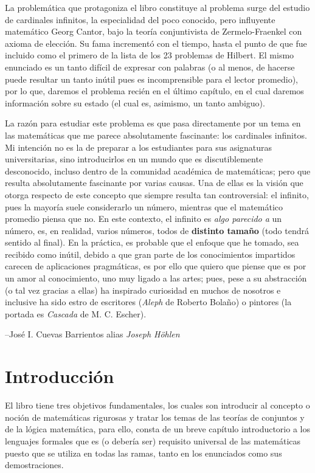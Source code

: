 \documentclass[11pt,a4paper]{book}
\begin{document}
La problemática que protagoniza el libro constituye al problema surge del estudio de cardinales infinitos, la especialidad del poco conocido, pero influyente matemático Georg Cantor, bajo la teoría conjuntivista de Zermelo-Fraenkel con axioma de elección. Su fama incrementó con el tiempo, hasta el punto de que fue incluido como el primero de la lista de los 23 problemas de Hilbert. El mismo enunciado es un tanto difícil de expresar con palabras (o al menos, de hacerse puede resultar un tanto inútil pues es incomprensible para el lector promedio), por lo que, daremos el problema recién en el último capítulo, en el cual daremos información sobre su estado (el cual es, asimismo, un tanto ambiguo).

La razón para estudiar este problema es que pasa directamente por un tema en las matemáticas que me parece absolutamente fascinante: los cardinales infinitos. Mi intención no es la de preparar a los estudiantes para sus asignaturas universitarias, sino introducirlos en un mundo que es discutiblemente desconocido, incluso dentro de la comunidad académica de matemáticas; pero que resulta absolutamente fascinante por varias causas. Una de ellas es la visión que otorga respecto de este concepto que siempre resulta tan controversial: el infinito, pues la mayoría suele considerarlo un número, mientras que el matemático promedio piensa que no. En este contexto, el infinito es \textit{algo parecido a} un número, es, en realidad, varios números, todos de \textbf{distinto tamaño} (todo tendrá sentido al final). En la práctica, es probable que el enfoque que he tomado, sea recibido como inútil, debido a que gran parte de los conocimientos impartidos carecen de aplicaciones pragmáticas, es por ello que quiero que piense que es por un amor al conocimiento, uno muy ligado a las artes; pues, pese a su abstracción (o tal vez gracias a ellas) ha inspirado curiosidad en muchos de nosotros e inclusive ha sido estro de escritores (\textit{Aleph} de Roberto Bolaño) o pintores (la portada es \textit{Cascada} de M. C. Escher).
\begin{flushright}
--José I. Cuevas Barrientos alias \textit{Joseph Höhlen}
\end{flushright}

\chapter{Introducción}
El libro tiene tres objetivos fundamentales, los cuales son introducir al concepto o noción de matemáticas rigurosas y tratar los temas de las teorías de conjuntos y de la lógica matemática, para ello, consta de un breve capítulo introductorio a los lenguajes formales que es (o debería ser) requisito universal de las matemáticas puesto que se utiliza en todas las ramas, tanto en los enunciados como sus demostraciones.
\end{document}
